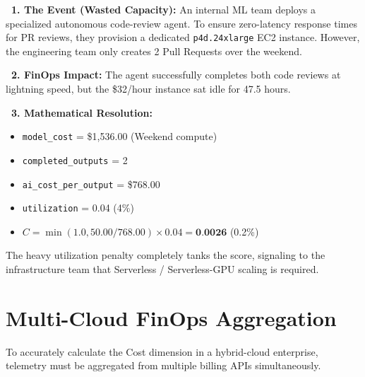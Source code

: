\documentclass[11pt,a4paper]{article}
\begin{document}
\vspace{0.5cm}
\begin{tcolorbox}[enhanced, colback=dpicloud!5!white, colframe=dpicloud, title={\textbf{\faServer\ Scenario 2: The Over-Provisioned Idle GPU (Poor Utilization)}}, fonttitle=\bfseries, boxrule=1pt, arc=2mm, drop shadow]
\textbf{\color{dpicloud}\faHourglassHalf\ 1. The Event (Wasted Capacity):} 
An internal ML team deploys a specialized autonomous code-review agent. To ensure zero-latency response times for PR reviews, they provision a dedicated \texttt{p4d.24xlarge} EC2 instance. However, the engineering team only creates 2 Pull Requests over the weekend.

\vspace{0.2cm}
\textbf{\color{dpired}\faMoneyBillWave\ 2. FinOps Impact:} 
The agent successfully completes both code reviews at lightning speed, but the \$32/hour instance sat idle for 47.5 hours. 

\vspace{0.2cm}
\textbf{\color{dpigreen}\faCalculator\ 3. Mathematical Resolution:}
\begin{itemize}
    \item \texttt{model\_cost} = \$1,536.00 (Weekend compute)
    \item \texttt{completed\_outputs} = 2
    \item \texttt{ai\_cost\_per\_output} = \$768.00
    \item \texttt{utilization} = 0.04 (4\%)
    \item $C = \min(1.0, 50.00 / 768.00) \times 0.04 = \textbf{0.0026}$ (0.2\%)
\end{itemize}
\vspace{0.2cm}
The heavy utilization penalty completely tanks the score, signaling to the infrastructure team that Serverless / Serverless-GPU scaling is required.
\end{tcolorbox}

\newpage

\section{Multi-Cloud FinOps Aggregation}

To accurately calculate the Cost dimension in a hybrid-cloud enterprise, telemetry must be aggregated from multiple billing APIs simultaneously.
\end{document}
